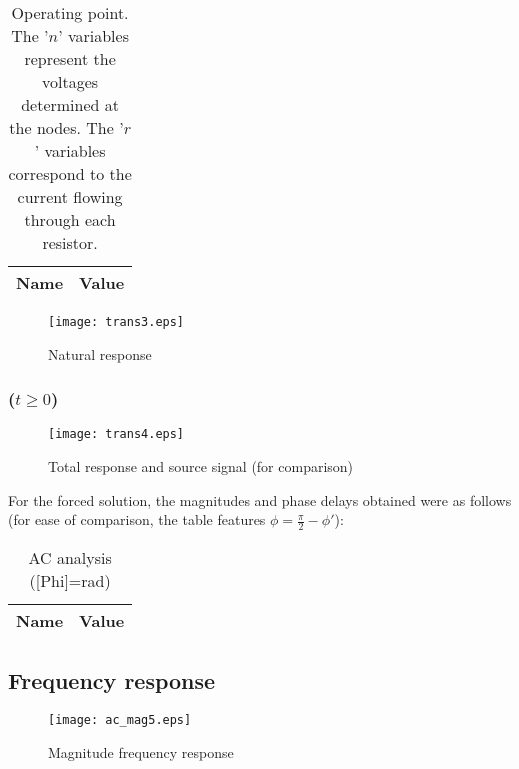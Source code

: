 \begin{table}[H]
	\centering
	\begin{tabular}{|l|c|}
		\hline    
		    {\bf Name} & {\bf Value} \\
                    \hline
                    \hline
		
	\end{tabular}
	\caption{Operating point. The '$n$' variables represent the voltages determined at the nodes. The '$r$' variables correspond to the current flowing through each resistor.}
	\label{tab:op2}
\end{table}

\begin{figure}[H]
  \centering
  \texttt{[image: trans3.eps]}
  \caption{Natural response}
  \label{fig:nat_sim}
\end{figure}

\subsubsection{($ t \geq 0$)}

\begin{figure}[H]
  \centering
  \texttt{[image: trans4.eps]}
  \caption{Total response and source signal (for comparison)}
  \label{fig:tot:sim}
\end{figure}

For the forced solution, the magnitudes and phase delays obtained were as follows (for ease of comparison, the table features $\phi = \frac{\pi}{2} - \phi'$):

\begin{table}[H]
	\centering
	\begin{tabular}{|l|c|}
		\hline    
		    {\bf Name} & {\bf Value} \\
                    \hline
                    \hline
		
	\end{tabular}
	\caption{AC analysis ([Phi]=rad)}
	\label{tab:op4}
\end{table}

\subsection{Frequency response}

\begin{figure}[H]
  \centering
  \texttt{[image: ac\_mag5.eps]}
  \caption{Magnitude frequency response}
  \label{freq_resp_mag_sim}
\end{figure}

